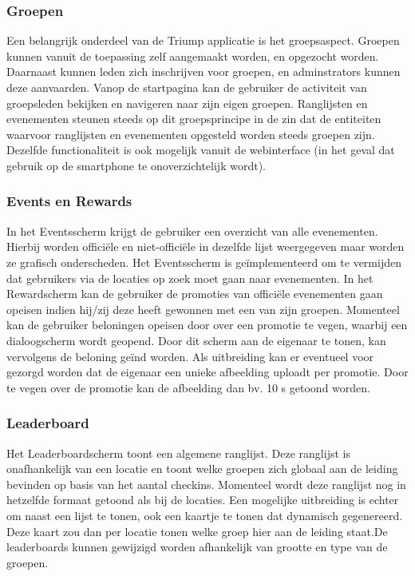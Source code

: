 \subsubsection{Groepen}%
Een belangrijk onderdeel van de Triump applicatie is het groepsaspect. Groepen kunnen vanuit de toepassing zelf aangemaakt worden, en opgezocht worden. Daarnaast kunnen leden zich inschrijven voor groepen, en adminstrators kunnen deze aanvaarden. Vanop de startpagina kan de gebruiker de activiteit van groepsleden bekijken en navigeren naar zijn eigen groepen. Ranglijsten en evenementen steunen steeds op dit groepsprincipe in de zin dat de entiteiten waarvoor ranglijsten en evenementen opgesteld worden steeds groepen zijn. Dezelfde functionaliteit is ook mogelijk vanuit de webinterface (in het geval dat gebruik op de smartphone te onoverzichtelijk wordt).

\subsubsection{Events en Rewards}%
In het Eventsscherm krijgt de gebruiker een overzicht van alle evenementen. Hierbij worden officiële en niet-officiële in dezelfde lijst weergegeven maar worden ze grafisch onderscheden. Het Eventsscherm is geïmplementeerd om te vermijden dat gebruikers via de locaties op zoek moet gaan naar evenementen.
In het Rewardscherm kan de gebruiker de promoties van officiële evenementen gaan opeisen indien hij/zij deze heeft gewonnen met een van zijn groepen. Momenteel kan de gebruiker beloningen opeisen door over een promotie te vegen, waarbij een dialoogscherm wordt geopend. Door dit scherm aan de eigenaar te tonen, kan vervolgens de beloning geïnd worden. Als uitbreiding kan er eventueel voor gezorgd worden dat de eigenaar een unieke afbeelding uploadt per promotie. Door te vegen over de promotie kan de afbeelding dan bv. 10 s getoond worden.
\subsubsection{Leaderboard}%
Het Leaderboardscherm toont een algemene ranglijst. Deze ranglijst is onafhankelijk van een locatie en toont welke groepen zich globaal aan de leiding bevinden op basis van het aantal checkins. Momenteel wordt deze ranglijst nog in hetzelfde formaat getoond als bij de locaties. Een mogelijke uitbreiding is echter om naast een lijst te tonen, ook een kaartje te tonen dat dynamisch gegenereerd. Deze kaart zou dan per locatie tonen welke groep hier aan de leiding staat.De leaderboards kunnen gewijzigd worden afhankelijk van grootte en type van de groepen.
